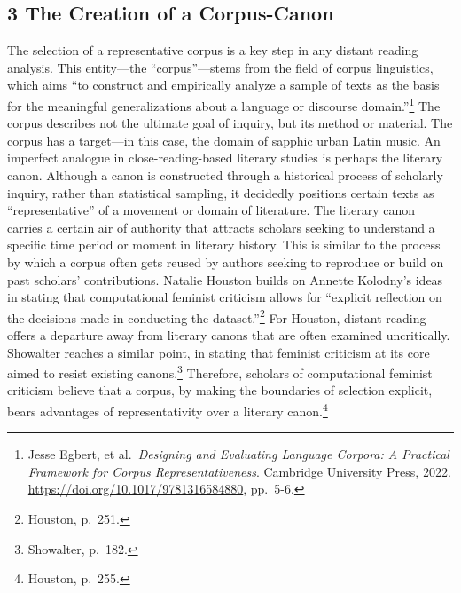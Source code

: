 \documentclass[
  letterpaper,
  DIV=11,
  numbers=noendperiod]{scrartcl}
\begin{document}
\hypertarget{the-creation-of-a-corpus-canon}{%
\subsection{\texorpdfstring{3 \textbf{The Creation of a
Corpus-Canon}}{3 The Creation of a Corpus-Canon}}\label{the-creation-of-a-corpus-canon}}

The selection of a representative corpus is a key step in any distant
reading analysis. This entity---the ``corpus''---stems from the field of
corpus linguistics, which aims ``to construct and empirically analyze a
sample of texts as the basis for the meaningful generalizations about a
language or discourse domain.''\footnote{Jesse Egbert, et
  al.~\emph{Designing and Evaluating Language Corpora: A Practical
  Framework for Corpus Representativeness}. Cambridge University Press,
  2022. \url{https://doi.org/10.1017/9781316584880}, pp.~5-6.} The
corpus describes not the ultimate goal of inquiry, but its method or
material. The corpus has a target---in this case, the domain of sapphic
urban Latin music. An imperfect analogue in close-reading-based literary
studies is perhaps the literary canon. Although a canon is constructed
through a historical process of scholarly inquiry, rather than
statistical sampling, it decidedly positions certain texts as
``representative'' of a movement or domain of literature. The literary
canon carries a certain air of authority that attracts scholars seeking
to understand a specific time period or moment in literary history. This
is similar to the process by which a corpus often gets reused by authors
seeking to reproduce or build on past scholars' contributions. Natalie
Houston builds on Annette Kolodny's ideas in stating that computational
feminist criticism allows for ``explicit reflection on the decisions
made in conducting the dataset.''\footnote{Houston, p.~251.} For
Houston, distant reading offers a departure away from literary canons
that are often examined uncritically. Showalter reaches a similar point,
in stating that feminist criticism at its core aimed to resist existing
canons.\footnote{Showalter, p.~182.} Therefore, scholars of
computational feminist criticism believe that a corpus, by making the
boundaries of selection explicit, bears advantages of representativity
over a literary canon.\footnote{Houston, p.~255.}
\end{document}
